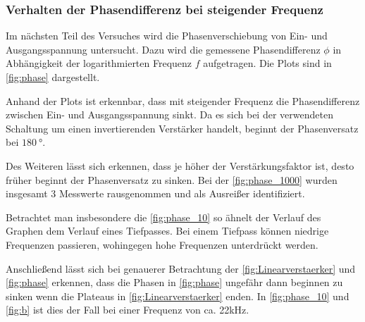 \subsubsection{Verhalten der Phasendifferenz bei steigender Frequenz}
Im nächsten Teil des Versuches wird die Phasenverschiebung von Ein- und Ausgangsspannung 
untersucht.
Dazu wird die gemessene Phasendifferenz $\phi$ in Abhängigkeit der logarithmierten Frequenz $f$
aufgetragen.
Die Plots sind in \autoref{fig:phase} dargestellt.

Anhand der Plots ist erkennbar, dass mit steigender Frequenz die Phasendifferenz zwischen 
Ein- und Ausgangsspannung sinkt.
Da es sich bei der verwendeten Schaltung um einen invertierenden Verstärker handelt, beginnt 
der Phasenversatz bei $\SI{180}{\degree}$.

Des Weiteren lässt sich erkennen, dass je höher der Verstärkungsfaktor ist, desto früher
beginnt der Phasenversatz zu sinken. 
Bei der \autoref{fig:phase_1000} wurden insgesamt 3 Messwerte rausgenommen und 
als Ausreißer identifiziert.

Betrachtet man insbesondere die \autoref{fig:phase_10} so ähnelt der Verlauf
des Graphen dem Verlauf eines Tiefpasses.
Bei einem Tiefpass können niedrige Frequenzen passieren, wohingegen hohe Frequenzen
unterdrückt werden.

Anschließend lässt sich bei genauerer Betrachtung
der \autoref{fig:Linearverstaerker} und \autoref{fig:phase}
erkennen, dass die Phasen in \autoref{fig:phase} ungefähr dann beginnen zu sinken wenn die Plateaus 
in \autoref{fig:Linearverstaerker} enden.
In \autoref{fig:phase_10} und \autoref{fig:b} ist dies der Fall bei einer Frequenz von ca. 22kHz.

